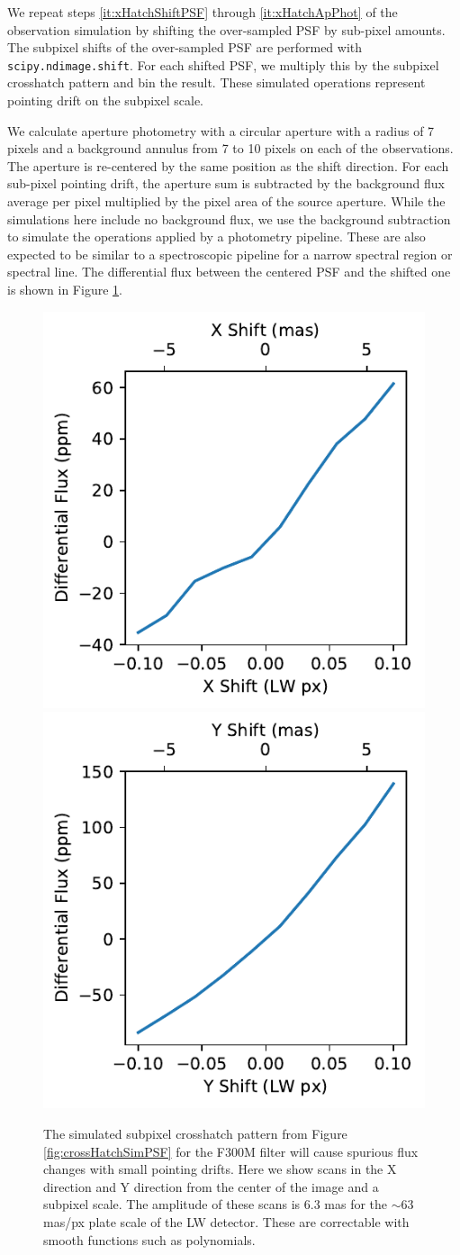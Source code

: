 \documentclass[]{aastex62}
\begin{document}
We repeat steps \ref{it:xHatchShiftPSF} through \ref{it:xHatchApPhot} of the observation simulation by shifting the over-sampled PSF by sub-pixel amounts.
The subpixel shifts of the over-sampled PSF are performed with \texttt{scipy.ndimage.shift}.
For each shifted PSF, we multiply this by the subpixel crosshatch pattern and bin the result.
These simulated operations represent pointing drift on the subpixel scale.

We calculate aperture photometry with a circular aperture with a radius of 7 pixels and a background annulus from 7 to 10 pixels on each of the observations.
The aperture is re-centered by the same position as the shift direction.
For each sub-pixel pointing drift, the aperture sum is subtracted by the background flux average per pixel multiplied by the pixel area of the source aperture.
While the simulations here include no background flux, we use the background subtraction to simulate the operations applied by a photometry pipeline.
These are also expected to be similar to a spectroscopic pipeline for a narrow spectral region or spectral line.
The differential flux between the centered PSF and the shifted one is shown in Figure \ref{fig:subpixScanSimulation}.


\begin{figure}[!hbtp]
\centering
\includegraphics[width=.49\columnwidth]{scan_F300M_x_short_scan.pdf}
\includegraphics[width=.49\columnwidth]{scan_F300M_y_short_scan.pdf}
\caption{
The simulated subpixel crosshatch pattern from Figure \ref{fig:crossHatchSimPSF} for the F300M filter will cause spurious flux changes with small pointing drifts.
Here we show scans in the X direction and Y direction from the center of the image and a subpixel scale.
The amplitude of these scans is 6.3 mas for the $\sim$63 mas/px plate scale of the LW detector.
These are correctable with smooth functions such as polynomials.
}\label{fig:subpixScanSimulation}
\end{figure}
\end{document}
